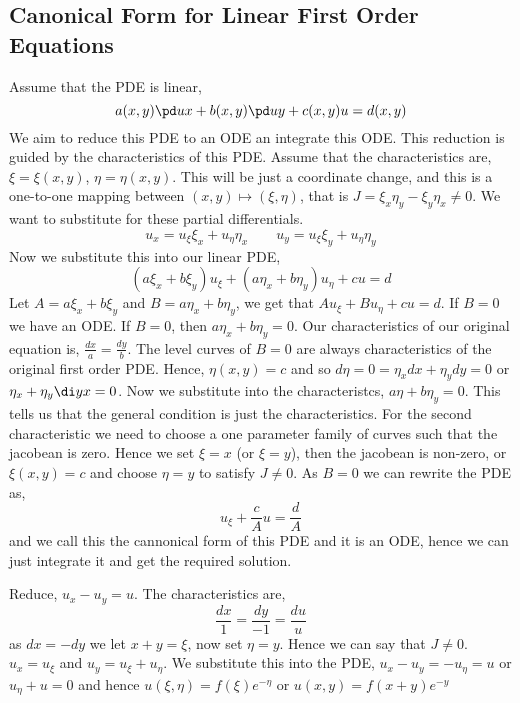 \subsection{Canonical Form for Linear First Order Equations}
Assume that the PDE is linear,
$$ a(x, y)\pd u x + b(x, y)\pd u y + c(x, y)u = d(x, y) $$
We aim to reduce this PDE to an ODE an integrate this ODE. This reduction is guided by the characteristics of this PDE. Assume that the characteristics are, $\xi = \xi(x, y)$, $\eta = \eta(x, y)$. This will be just a coordinate change, and this is a one-to-one mapping between $(x, y) \mapsto (\xi, \eta)$, that is $J = \xi_x\eta_y - \xi_y\eta_x \ne 0$. We want to substitute for these partial differentials.
$$ u_x = u_\xi\xi_x + u_\eta\eta_x \qquad u_y = u_\xi\xi_y + u_\eta\eta_y$$
Now we substitute this into our linear PDE,
$$ (a\xi_x + b\xi_y)u_\xi + (a\eta_x + b\eta_y)u_\eta + cu = d $$
Let $A = a\xi_x + b\xi_y$ and $B = a\eta_x + b\eta_y$, we get that $Au_\xi + Bu_\eta + cu = d$. If $B = 0$ we have an ODE. If $B = 0$, then $a\eta_x + b\eta_y = 0$. Our characteristics of our original equation is, $\frac{dx}{a} = \frac{dy}{b}$. The level curves of $B = 0$ are always characteristics of the original first order PDE. Hence, $\eta(x, y) = c$ and so $d\eta = 0 = \eta_x dx + \eta_ydy = 0$ or $\eta_x + \eta_y \di y x = 0$. Now we substitute into the characteristcs, $a\eta + b\eta_y = 0$.
This tells us that the general condition is just the characteristics. For the second characteristic we need to choose a one parameter family of curves such that the jacobean is zero. Hence we set $\xi = x$ (or $\xi = y$), then the jacobean is non-zero, or $\xi(x, y) = c$ and choose $\eta = y$ to satisfy $J \ne 0$. As $B = 0$ we can rewrite the PDE as,
$$ u_\xi + \frac{c}{A}u = \frac{d}{A} $$
and we call this the cannonical form of this PDE and it is an ODE, hence we can just integrate it and get the required solution.

\begin{eg}
  Reduce, $u_x - u_y = u$. The characteristics are,
  $$ \frac{dx}{1} = \frac{dy}{-1} = \frac{du}{u} $$
  as $dx = -dy$ we let $x + y = \xi$, now set $\eta = y$. Hence we can say that $J \ne 0$. $u_x = u_\xi$ and $u_y = u_\xi + u_\eta$. We substitute this into the PDE, $u_x - u_y = -u_\eta = u $ or $u_\eta + u = 0$ and hence $u(\xi, \eta) = f(\xi)e^{-\eta}$ or $u(x, y) = f(x + y)e^{-y}$
\end{eg}